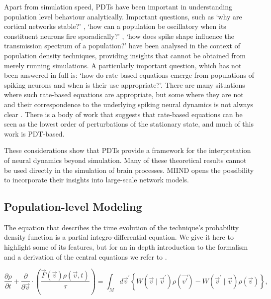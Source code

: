 \documentclass[utf8]{frontiersSCNS} %
\begin{document}
Apart from simulation speed, PDTs have been important in understanding population level behaviour analytically. Important questions, such as `why are cortical networks stable?' \citep{amit1997model}, `how can a population be oscillatory when its constituent neurons fire sporadically?'
\citep{brunel1999fast}, `how does spike shape influence the transmission spectrum of a population?'\citep{fourcaud2003spike} have been analysed in the context of population density techniques, providing insights that cannot be obtained from merely running simulations. A particularly important question, which has not been answered in full is: `how do rate-based equations emerge from populations of spiking neurons and when is their use appropriate?'.  There are many situations where such rate-based equations are appropriate, but some where they are not and their correspondence to the underlying spiking neural dynamics is not always clear \citep{montbrio2015macroscopic,de2013generic}. There is a body of work that suggests that rate-based equations can be seen as the lowest order of perturbations of the stationary state, and much of this work is PDT-based.

These considerations show that PDTs provide a framework for the interpretation of neural dynamics beyond simulation. Many of these theoretical results cannot be used directly in the simulation of brain processes. MIIND opens the possibility to incorporate their insights into large-scale network models.\\

\subsection{Population-level Modeling}

The equation that describes the time evolution of the technique's probability density function is a partial integro-differential equation. We give it here to highlight some of its features, but for an in depth introduction to the formalism and a derivation of the central equations we refer to \cite{omurtag2000}.

\begin{equation}                                        
  \frac{ \partial \rho }{ \partial t } + \frac{\partial}{ \partial \vec{v}} \cdot ( \frac{\vec{F}(\vec{v}) \rho(\vec{v},t)}{\tau} ) = \int_{M} d \vec{v}^{\prime} \left\{ W(\vec{v} \mid \vec{v}^{\prime})\rho(\vec{v'}) - W(\vec{v}^{\prime} \mid \vec{v}  )\rho(\vec{v}) \right\},
\label{eq-balance}                                          
\end{equation}  
\end{document}
